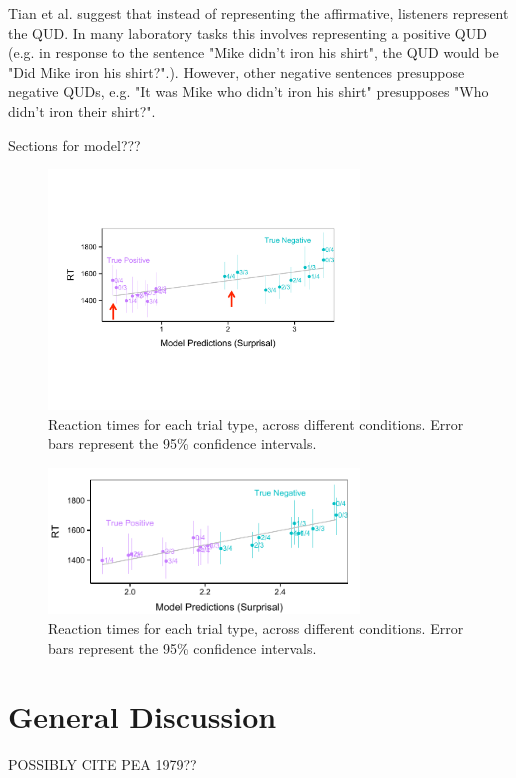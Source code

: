 \documentclass[10pt,letterpaper]{article}
\begin{document}
Tian et al. suggest that instead of representing the affirmative, listeners represent the QUD.  In many laboratory tasks this involves representing a positive QUD (e.g. in response to the sentence "Mike didn't iron his shirt", the QUD would be "Did Mike iron his shirt?".).  However, other negative sentences presuppose negative QUDs, e.g. "It was Mike who didn't iron his shirt" presupposes "Who didn't iron their shirt?".  

Sections for model???

\begin{figure}
\begin{center} 
\includegraphics[width=3.25in]{figures/model1_comparison.pdf}
\caption{\label{fig:addition_subs} Reaction times for each trial type, across different conditions.  Error bars represent the 95\% confidence intervals.}
\end{center} 
\end{figure}

\begin{figure}
\begin{center} 
\includegraphics[width=3.25in]{figures/model2_comparison.pdf}
\caption{\label{fig:addition_subs} Reaction times for each trial type, across different conditions.  Error bars represent the 95\% confidence intervals.}
\end{center} 
\end{figure}


\section{General Discussion}
POSSIBLY CITE PEA 1979??
\end{document}
